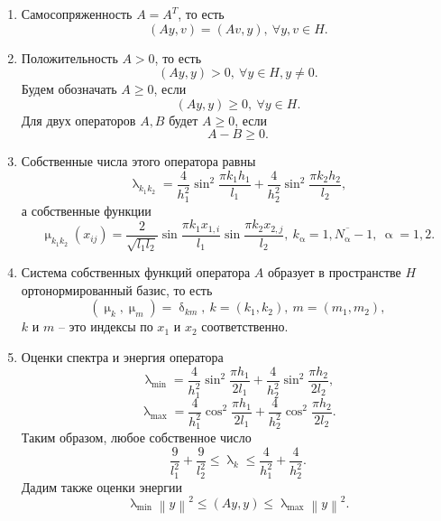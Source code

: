\documentclass[a4paper, 12pt]{report}
\numberwithin{equation}{section}
\newcommand{\ol}{\overline}
\renewcommand{\leq}{\leqslant}
\renewcommand{\geq}{\geqslant}
\renewcommand{\alpha}{\upalpha}
\renewcommand{\delta}{\updelta}
\renewcommand{\lambda}{\uplambda}
\renewcommand{\mu}{\upmu}
\newcommand\Norm[1]{\left\| #1 \right\|}
\begin{document}
	\begin{enumerate}
		\item Самосопряженность $A = A^T$, то есть
		$$(A y, v) = (Av,y),\ \forall y,v \in H.$$
		\item Положительность $A > 0$, то есть $$(Ay, y) > 0,\ \forall y \in H, y \ne 0.$$
		Будем обозначать $A \geq 0$, если $$(Ay , y)\geq 0,\ \forall y \in H.$$
		Для двух операторов $A,B$ будет $A\geq 0$, если $$A - B \geq 0.$$
		\item Собственные числа этого оператора равны
		$$\lambda_{k_1 k_2} = \dfrac{4}{h_1^2}\sin^2 \dfrac{\pi k_1 h_1}{l_1} + \dfrac{4}{h_2^2}\sin^2 \dfrac{\pi k_2 h_2}{l_2},$$
		а собственные функции 
		$$\mu_{k_1k_2}(x_{ij}) = \dfrac{2}{\sqrt{l_1 l_2}} \sin \dfrac{\pi k_1 x_{1,i}}{l_1}\sin\dfrac{\pi k_2 x_{2,j}}{l_2},\ k_\alpha = \ol {1, N_\alpha-1},\ \alpha=1,2.$$
		\item Система собственных функций оператора $A$ образует в пространстве $H$ ортонормированный базис, то есть
		$$(\mu_{k}, \mu_m) = \delta_{km},\ k=(k_1,k_2),\ m=(m_1, m_2),$$
		$k$ и $m$ -- это индексы по $x_1$ и $x_2$ соответственно.
		\item Оценки спектра и энергия оператора
		$$\lambda_{\min} = \dfrac{4}{h_1^2}\sin^2 \dfrac{\pi h_1}{2 l_1} + \dfrac{4}{h_2^2}\sin^2 \dfrac{\pi h_2}{2 l_2},$$
		$$\lambda_{\max}=\dfrac{4}{h_1^2}\cos^2 \dfrac{\pi h_1}{2 l_1} + \dfrac{4}{h_2^2}\cos^2 \dfrac{\pi h_2}{2 l_2}.$$
		Таким образом, любое собственное число
		$$\dfrac{9}{l_1^2} + \dfrac{9}{l_2^2}\leq \lambda_k \leq \dfrac{4}{h_1^2} + \dfrac{4}{h_2^2}.$$
		Дадим также оценки энергии
		$$\lambda_{\min}\Norm{y}^2\leq(Ay,y) \leq \lambda_{\max}\Norm{y}^2.$$
	\end{enumerate}
\end{document}
